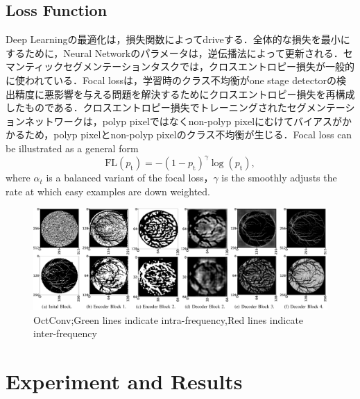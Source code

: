 \documentclass{article}
\begin{document}
\subsection{Loss Function}
Deep Learningの最適化は，損失関数によってdriveする．全体的な損失を最小にするために，Neural Networkのパラメータは，逆伝播法によって更新される．セマンティックセグメンテーションタスクでは，クロスエントロピー損失が一般的に使われている．Focal lossは，学習時のクラス不均衡がone stage detectorの検出精度に悪影響を与える問題を解決するためにクロスエントロピー損失を再構成したものである．クロスエントロピー損失でトレーニングされたセグメンテーションネットワークは，polyp pixelではなくnon-polyp pixelにむけてバイアスがかかるため，polyp pixelとnon-polyp pixelのクラス不均衡が生じる．Focal loss can be illustrated as a general form  \begin{equation}
\mathrm{FL}\left(p_{\mathrm{t}}\right)=-\left(1-p_{\mathrm{t}}\right)^{\gamma} \log \left(p_{\mathrm{t}}\right),
\end{equation}
where $\alpha_t$ is a balanced variant of the focal loss，$\gamma$ is the smoothly adjusts the rate at which easy examples are down weighted.
\begin{figure}[t]
\begin{center}
\includegraphics[width=180mm]{fig3.eps}
\caption{OctConv;Green lines indicate intra-frequency,Red lines indicate inter-frequency }
\end{center}
\end{figure}
\section{Experiment and Results}
\label{sec:res}
\end{document}
